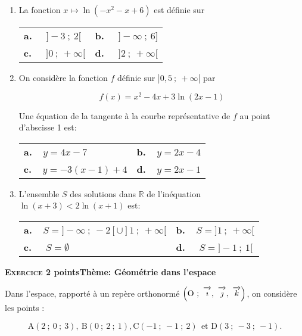 \documentclass[11pt,a4paper,french]{article}
\newcommand{\R}{\mathbb{R}}
\newcommand{\vect}[1]{\overrightarrow{\,\mathstrut#1\,}}
\def\Oijk{$\left(\text{O}~;~\vect{\imath},~\vect{\jmath},~\vect{k}\right)$}
\begin{document}
\begin{enumerate}
\item La  fonction $x \longmapsto  \ln \left(-x^2- x + 6\right)$ est définie sur

\begin{center}
\begin{tabularx}{\linewidth}{*{2}{X}}
\textbf{a.~~} $]- 3~;~2[$&\textbf{b.~~} $]- \infty~;~6]$\\
\textbf{c.~~} $]0~;~+\infty[$&\textbf{d.~~} $]2~;~+\infty[$
\end{tabularx}
\end{center}

\item On considère la fonction $f$ définie sur $]0,5~;~+ \infty [$ par 

\[f(x) =x^2- 4x+ 3 \ln (2x - 1)\]

Une équation de la tangente à la courbe représentative de $f$ au point d'abscisse 1 est:

\begin{center}
\begin{tabularx}{\linewidth}{*{2}{X}}
\textbf{a.~~}$y = 4x- 7$ &\textbf{b.~~}$y = 2x - 4$\\
\textbf{c.~~}$y = -3(x - 1) + 4$ &\textbf{d.~~}$y = 2x - 1$
\end{tabularx}
\end{center}

\item L'ensemble $S$ des solutions dans $\R$ de l'inéquation $\ln (x + 3) < 2\ln (x + 1)$ est:

\begin{center}
\begin{tabularx}{\linewidth}{*{2}{X}}
\textbf{a.~~}$S = ]- \infty~;~-2[ \cup ]1~;~+\infty[$&\textbf{b.~~}$S = ]1~;~+ \infty[$\\
\textbf{c.~~} $S = \emptyset$&\textbf{d.~~} $S = ]- 1~;~1[$
\end{tabularx}
\end{center}

\end{enumerate}

\bigskip

\textbf{\textsc{Exercice 2}  points\hfill Thème: Géométrie dans l'espace}

\medskip

Dans l'espace, rapporté à un repère orthonormé \Oijk, on considère les points : 

\[\text{A}(2~;~0~;~3),\: \text{B}(0~;~2~;~1), \text{C}(-1~;~-1~;~2)\:\: \text{et D}(3~;~-3~;~ -1).\]
\smallskip
\end{document}
